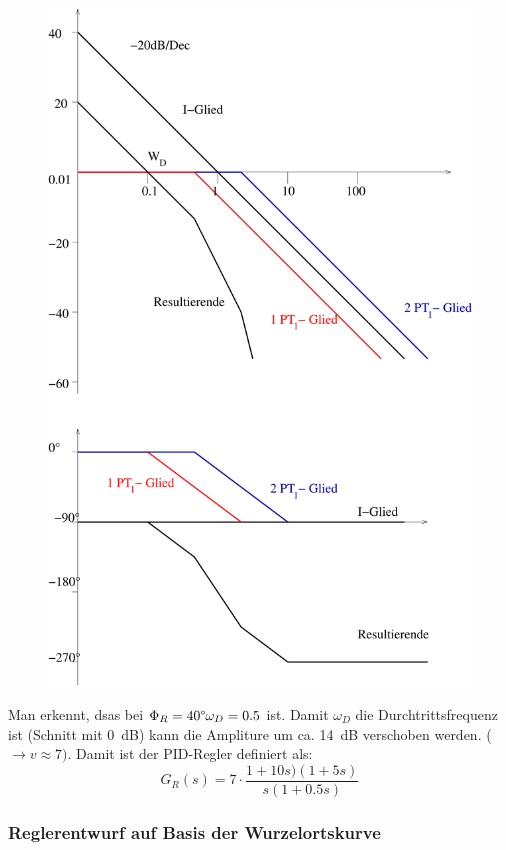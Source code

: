\documentclass[12pt,a4paper,ngerman]{scrartcl}
\begin{document}
\begin{figure}[H]
  \centering
  \includegraphics[width=.7\linewidth]{sysregel_bode_5-4}
\end{figure}
Man erkennt, dsas bei $\Phi_R=40\degree \omega_D=0.5$ ist. Damit $ \omega_D$ die Durchtrittsfrequenz ist (Schnitt mit 0~dB) kann die Ampliture um ca. 14~dB verschoben werden. ($\rightarrow v\approx 7)$. Damit ist der PID-Regler definiert als:
\[
G_R(s)=7\cdot \frac{1+10s)(1+5s)}{s(1+0.5s)}
\]

\subsubsection{Reglerentwurf auf Basis der Wurzelortskurve}
\end{document}
